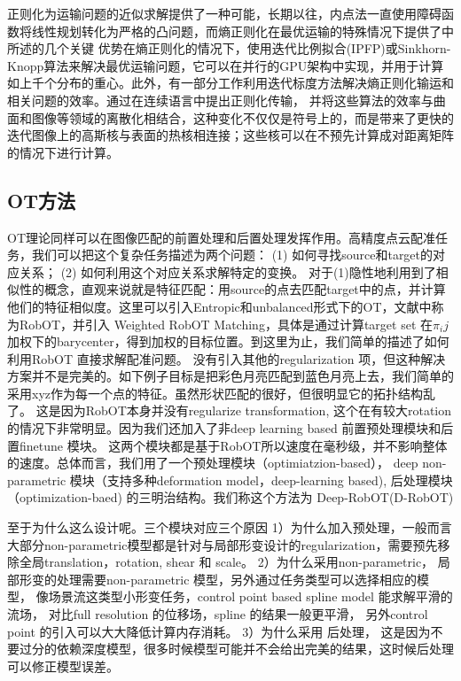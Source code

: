正则化为运输问题的近似求解提供了一种可能，长期以往，内点法一直使用障碍函数将线性规划转化为严格的凸问题，而熵正则化在最优运输的特殊情况下提供了\cite{distances2013lightspeed}中所述的几个关键
优势在熵正则化的情况下，使用迭代比例拟合(IPFP)或Sinkhorn-Knopp算法来解决最优运输问题\cite{deming1940least,sinkhorn1967diagonal}，它可以在并行的GPU架构中实现，并用于计算
如上千个分布的重心\cite{cuturi2014fast}。此外，有一部分工作\cite{solomon2015convolutional}利用迭代标度方法解决熵正则化输运和相关问题的效率\cite{distances2013lightspeed,benamou2015iterative}。通过在连续语言中提出正则化传输，
并将这些算法的效率与曲面和图像等领域的离散化相结合，这种变化不仅仅是符号上的，而是带来了更快的迭代图像上的高斯核与表面的热核相连接；这些核可以在不预先计算成对距离矩阵的情况下进行计算。

\subsection{OT方法}

OT理论同样可以在图像匹配的前置处理和后置处理发挥作用。高精度点云配准任务\cite{shen2021accurate}，我们可以把这个复杂任务描述为两个问题：
(1) 如何寻找source和target的对应关系；
(2) 如何利用这个对应关系求解特定的变换。
对于(1)隐性地利用到了相似性的概念，直观来说就是特征匹配：用source的点去匹配target中的点，并计算他们的特征相似度。这里可以引入Entropic和unbalanced形式下的OT，文献中称为RobOT，并引入
Weighted RobOT Matching，具体是通过计算target set 在$\pi_ij$加权下的barycenter，得到加权的目标位置。到这里为止，我们简单的描述了如何利用RobOT 直接求解配准问题。
没有引入其他的regularization 项，但这种解决方案并不是完美的。如下例子目标是把彩色月亮匹配到蓝色月亮上去，我们简单的采用xyz作为每一个点的特征。虽然形状匹配的很好，但很明显它的拓扑结构乱了。
这是因为RobOT本身并没有regularize transformation, 这个在有较大rotation 的情况下非常明显。因为我们还加入了非deep learning based 前置预处理模块和后置finetune 模块。
这两个模块都是基于RobOT所以速度在毫秒级，并不影响整体的速度。总体而言，我们用了一个预处理模块（optimiatzion-based）， deep non-parametric 模块（支持多种deformation 
model，deep-learning based), 后处理模块（optimization-baed) 的三明治结构。我们称这个方法为 Deep-RobOT(D-RobOT)

至于为什么这么设计呢。三个模块对应三个原因
1）为什么加入预处理，一般而言大部分non-parametric模型都是针对与局部形变设计的regularization，需要预先移除全局translation，rotation, shear 和 scale。
2）为什么采用non-parametric， 局部形变的处理需要non-parametric 模型，另外通过任务类型可以选择相应的模型， 像场景流这类型小形变任务，control point based spline model 能求解平滑的流场，
对比full resolution 的位移场，spline 的结果一般更平滑， 另外control point 的引入可以大大降低计算内存消耗。
3）为什么采用 后处理， 这是因为不要过分的依赖深度模型，很多时候模型可能并不会给出完美的结果，这时候后处理可以修正模型误差。

